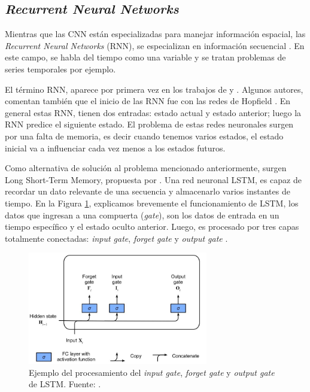 \subsection{\textit{Recurrent Neural Networks}}

Mientras que las CNN están especializadas para manejar información espacial, las \textit{Recurrent Neural Networks} (RNN), se especializan en información secuencial  \citep{zhang2021dive}. En este campo, se habla del tiempo como una variable y se tratan problemas de series temporales por ejemplo.

El término RNN, aparece por primera vez en los trabajos de \cite{rumelhart1985learning} y \cite{jordan1997serial}. Algunos autores, comentan también que el inicio de las RNN fue con las redes de Hopfield  \citep{hopfield1982neural}. En general estas RNN, tienen dos entradas: estado actual y estado anterior; luego la RNN predice el siguiente estado. El problema de estas redes neuronales surgen por una falta de memoria, es decir cuando tenemos varios estados, el estado inicial va a influenciar cada vez menos a los estados futuros.

Como alternativa de solución al problema mencionado anteriormente, surgen Long Short-Term Memory, propuesta por \cite{hochreiter1997long}. Una red neuronal LSTM, es capaz de recordar un dato relevante de una secuencia y almacenarlo varios instantes de tiempo. En la Figura \ref{fig:lstm}, explicamos brevemente el funcionamiento de LSTM, los datos que ingresan a una compuerta (\textit{gate}), son los datos de entrada en un tiempo específico y el estado oculto anterior. Luego, es procesado por tres capas totalmente conectadas: \textit{input gate}, \textit{forget gate} y \textit{output gate} \citep{zhang2021dive}.

\begin{figure}[H]
	\centering
	\includegraphics[width=0.7\textwidth]{../img/neoantigen/lstm}
	\caption{Ejemplo del procesamiento del \textit{input gate}, \textit{forget gate} y \textit{output gate} de LSTM. Fuente: \cite{zhang2021dive}.}
	\label{fig:lstm}
\end{figure}

